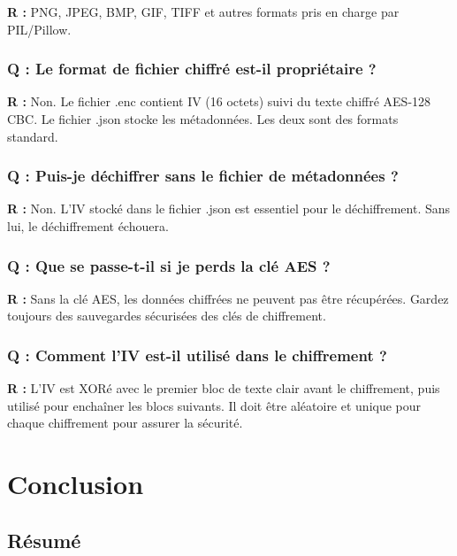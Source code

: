 \documentclass[12pt,a4paper]{report}
\begin{document}
\textbf{R :} PNG, JPEG, BMP, GIF, TIFF et autres formats pris en charge par PIL/Pillow.

\subsection{Q : Le format de fichier chiffré est-il propriétaire ?}

\textbf{R :} Non. Le fichier .enc contient IV (16 octets) suivi du texte chiffré AES-128 CBC. Le fichier .json stocke les métadonnées. Les deux sont des formats standard.

\subsection{Q : Puis-je déchiffrer sans le fichier de métadonnées ?}

\textbf{R :} Non. L'IV stocké dans le fichier .json est essentiel pour le déchiffrement. Sans lui, le déchiffrement échouera.

\subsection{Q : Que se passe-t-il si je perds la clé AES ?}

\textbf{R :} Sans la clé AES, les données chiffrées ne peuvent pas être récupérées. Gardez toujours des sauvegardes sécurisées des clés de chiffrement.

\subsection{Q : Comment l'IV est-il utilisé dans le chiffrement ?}

\textbf{R :} L'IV est XORé avec le premier bloc de texte clair avant le chiffrement, puis utilisé pour enchaîner les blocs suivants. Il doit être aléatoire et unique pour chaque chiffrement pour assurer la sécurité.

\chapter{Conclusion}

\section{Résumé}
\end{document}
